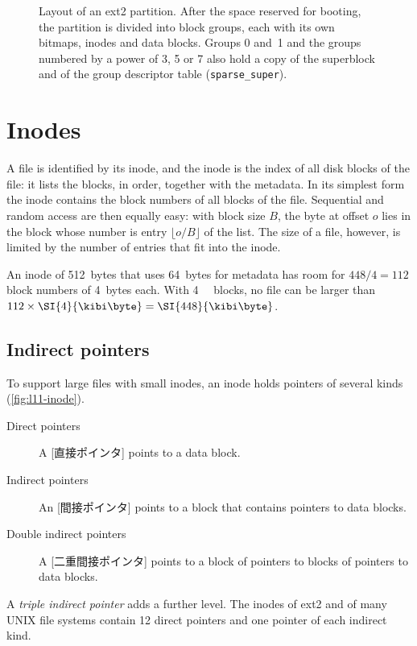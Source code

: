 \documentclass[../main.tex]{subfiles}
\begin{document}
\begin{figure}[htbp]
  \centering
  
  \caption{Layout of an ext2 partition.  After the space reserved for
    booting, the partition is divided into block groups, each with its own
    bitmaps, inodes and data blocks.  Groups 0 and~1 and the groups numbered
    by a power of 3, 5 or 7 also hold a copy of the superblock and of the
    group descriptor table (\texttt{sparse\_super}).}
  \label{fig:l11-ext2}
\end{figure}

\section{Inodes}
\label{sec:l11-inodes}

A file is identified by its inode, and the inode is the index
of all disk blocks of the file: it lists the blocks, in order, together with
the metadata.  In its simplest form the inode contains the block numbers
of all blocks of the file.  Sequential and random access are then equally
easy: with block size $B$, the byte at offset $o$ lies in the block whose
number is entry $\lfloor o/B \rfloor$ of the list.  The size of a file,
however, is limited by the number of entries that fit into the inode.

\begin{example}
  An inode of 512~bytes that uses 64~bytes for metadata has room
  for $448/4 = 112$ block numbers of 4~bytes each.  With
  \SI{4}{\kibi\byte} blocks, no file can be larger than
  $112 \times \SI{4}{\kibi\byte} = \SI{448}{\kibi\byte}$.
\end{example}

\subsection{Indirect pointers}

To support large files with small inodes, an inode holds pointers of several
kinds (\cref{fig:l11-inode}).
\begin{description}
  \item[Direct pointers] A [直接ポインタ] points to a
    data block.
  \item[Indirect pointers] An [間接ポインタ] points
    to a block that contains pointers to data blocks.
  \item[Double indirect pointers] A
    [二重間接ポインタ] points to a block of
    pointers to blocks of pointers to data blocks.
\end{description}
A \emph{triple indirect pointer} adds a further level.  The inodes of ext2
and of many UNIX file systems contain 12 direct pointers and one pointer of
each indirect kind.
\end{document}
